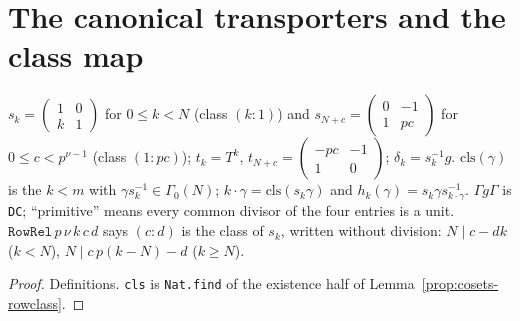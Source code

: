 \section{The canonical transporters and the class map}

\begin{definition}\label{def:cosetreps}
  \leanok
  $s_k=\left(\begin{smallmatrix}1&0\\k&1\end{smallmatrix}\right)$ for $0\le k<N$ (class $(k:1)$) and
  $s_{N+c}=\left(\begin{smallmatrix}0&-1\\1&pc\end{smallmatrix}\right)$ for $0\le c<p^{\nu-1}$ (class $(1:pc)$);
  $t_k=T^k$, $t_{N+c}=\left(\begin{smallmatrix}-pc&-1\\1&0\end{smallmatrix}\right)$; $\delta_k=s_k^{-1}g$.
  $\mathrm{cls}(\gamma)$ is the $k<m$ with $\gamma s_k^{-1}\in\Gamma_0(N)$; $k\cdot\gamma=\mathrm{cls}(s_k\gamma)$ and
  $h_k(\gamma)=s_k\gamma s_{k\cdot\gamma}^{-1}$. $\Gamma g\Gamma$ is \texttt{DC}; ``primitive'' means every common divisor of
  the four entries is a unit. $\texttt{RowRel}\,p\,\nu\,k\,c\,d$ says $(c:d)$ is the class of $s_k$, written without
  division: $N\mid c-dk$ ($k<N$), $N\mid c\,p(k-N)-d$ ($k\ge N$).
\end{definition}
\begin{proof}
  \leanok
  Definitions. \texttt{cls} is \texttt{Nat.find} of the existence half of Lemma~\ref{prop:cosets-rowclass}.
\end{proof}

